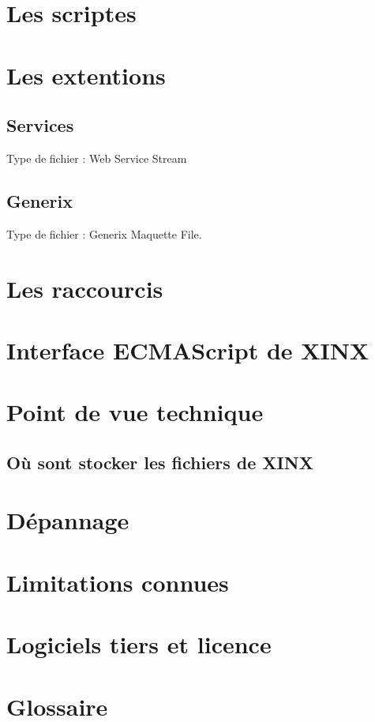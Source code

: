 \documentclass[a4paper,10pt,twoside]{book}
\begin{document}
\chapter{Les scriptes}
\label{sec:Scripts}

\chapter{Les extentions}

\section{Services}
\label{sec:Services}


Type de fichier : Web Service Stream


\section{Generix}
\label{sec:Generix}

Type de fichier : Generix Maquette File.

\appendix
\chapter{Les raccourcis}

\chapter{Interface ECMAScript de XINX}

\chapter{Point de vue technique}

\section{Où sont stocker les fichiers de XINX}

\chapter{Dépannage}

\chapter{Limitations connues}

\chapter{Logiciels tiers et licence}

\chapter{Glossaire}
\end{document}
